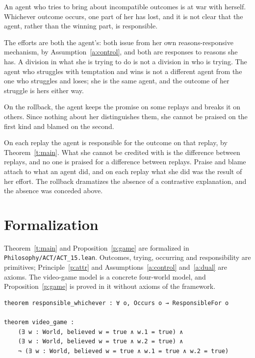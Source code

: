 \documentclass{situationist-preprint}
\begin{document}
\begin{objection}
An agent who tries to bring about incompatible outcomes is at war with herself. Whichever outcome occurs, one part of her has lost, and it is not clear that the agent, rather than the winning part, is responsible.
\end{objection}

\begin{reply}
The efforts are both the agent's: both issue from her own reasons-responsive mechanism, by Assumption~\ref{a:control}, and both are responses to reasons she has. A division in what she is trying to do is not a division in who is trying. The agent who struggles with temptation and wins is not a different agent from the one who struggles and loses; she is the same agent, and the outcome of her struggle is hers either way.
\end{reply}

\begin{objection}
On the rollback, the agent keeps the promise on some replays and breaks it on others. Since nothing about her distinguishes them, she cannot be praised on the first kind and blamed on the second.
\end{objection}

\begin{reply}
On each replay the agent is responsible for the outcome on that replay, by Theorem~\ref{t:main}. What she cannot be credited with is the difference between replays, and no one is praised for a difference between replays. Praise and blame attach to what an agent did, and on each replay what she did was the result of her effort. The rollback dramatizes the absence of a contrastive explanation, and the absence was conceded above.
\end{reply}

\section{Formalization}

Theorem~\ref{t:main} and Proposition~\ref{p:game} are formalized in \nolinkurl{Philosophy/ACT/ACT_15.lean}. Outcomes, trying, occurring and responsibility are primitives; Principle~\ref{p:attr} and Assumptions~\ref{a:control} and~\ref{a:dual} are axioms. The video-game model is a concrete four-world model, and Proposition~\ref{p:game} is proved in it without axioms of the framework.

\begin{lstlisting}
theorem responsible_whichever : ∀ o, Occurs o → ResponsibleFor o

theorem video_game :
    (∃ w : World, believed w = true ∧ w.1 = true) ∧
    (∃ w : World, believed w = true ∧ w.2 = true) ∧
    ¬ (∃ w : World, believed w = true ∧ w.1 = true ∧ w.2 = true)
\end{lstlisting}
\end{document}
